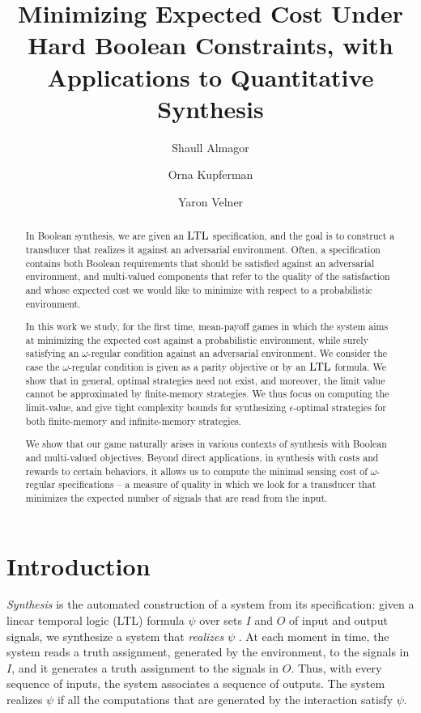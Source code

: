 \documentclass[runningheads,a4paper]{llncs}
\title{Minimizing Expected Cost Under Hard Boolean Constraints, with Applications to Quantitative Synthesis}
\author{Shaull Almagor \and Orna Kupferman \and Yaron Velner}
\institute{School of Computer Science and Engineering, The Hebrew University, Israel.}
\newcommand{\LTL}{{\ensuremath{\rm LTL}}\xspace}
\begin{document}
\maketitle
\begin{abstract}
In Boolean synthesis, we are given an \LTL specification, and the goal is to construct a transducer that realizes it against an adversarial environment. 
Often, a specification contains both Boolean requirements that should be satisfied against an adversarial environment, and multi-valued components that refer to the quality of the satisfaction and whose expected cost we would like to minimize with respect to a probabilistic environment. 

In this work we study, for the first time, mean-payoff games in which the system aims at minimizing the expected cost against a probabilistic environment, while surely satisfying an $\omega$-regular condition against an adversarial environment.
We consider the case the $\omega$-regular condition is given as a parity objective or by an \LTL formula.
We show that in general, optimal strategies need not exist, and moreover, the limit value cannot be approximated by finite-memory strategies. 
We thus focus on computing the limit-value, and give tight complexity bounds for synthesizing $\epsilon$-optimal strategies for both finite-memory and infinite-memory strategies.

We show that our game naturally arises in various contexts of synthesis with Boolean and multi-valued objectives. Beyond direct applications, in synthesis with costs and rewards to certain behaviors, it allows us to compute the minimal sensing cost of $\omega$-regular specifications -- a measure of quality in which we look for a transducer that minimizes the expected number of signals that are read from the input.
\end{abstract}

\section{Introduction}
\label{sec:intro}
{\em Synthesis\/} is the automated construction of a system from its specification: given a linear temporal logic (LTL)  formula $\psi$ over sets $I$ and $O$ of input and output signals, we synthesize a 
system that {\em realizes\/} $\psi$ \cite{Chu63,PR89a}. At each moment in time, the system reads a truth assignment, generated by the environment, to the signals in $I$, and it generates a truth assignment to the signals in $O$. Thus, with every sequence of inputs, the system associates a sequence of outputs. 
The system realizes $\psi$ if all the computations that are generated by the interaction satisfy $\psi$. 
\end{document}
